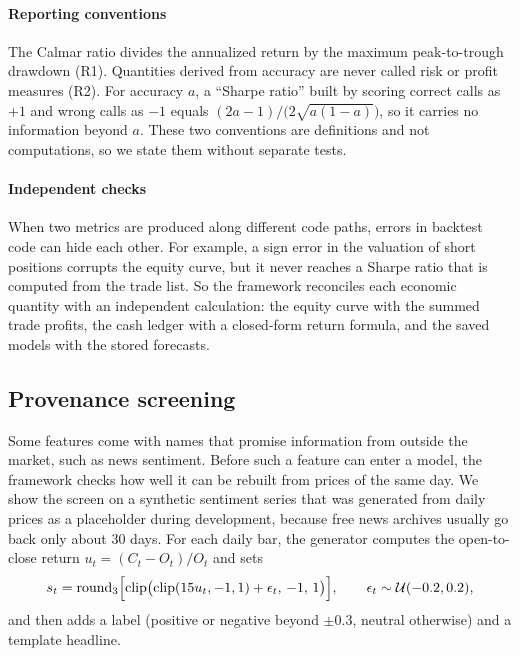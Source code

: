 \documentclass[preprint,12pt,authoryear,a4paper]{elsarticle}
\begin{document}
\paragraph{Reporting conventions} The Calmar ratio divides the annualized return by
the maximum peak-to-trough drawdown (R1). Quantities derived from accuracy are never
called risk or profit measures (R2). For accuracy $a$, a ``Sharpe ratio'' built by
scoring correct calls as $+1$ and wrong calls as $-1$ equals
$(2a-1)/\bigl(2\sqrt{a(1-a)}\bigr)$, so it carries no information beyond $a$. These
two conventions are definitions and not computations, so we state them without
separate tests.

\paragraph{Independent checks} When two metrics are produced along different code
paths, errors in backtest code can hide each other. For example, a sign error in the
valuation of short positions corrupts the equity curve, but it never reaches a
Sharpe ratio that is computed from the trade list. So the framework reconciles each
economic quantity with an independent calculation: the equity curve with the summed
trade profits, the cash ledger with a closed-form return formula, and the saved
models with the stored forecasts.

\subsection{Provenance screening}\label{ssec:provenance}

Some features come with names that promise information from outside the market,
such as news sentiment. Before such a feature can enter a model, the framework
checks how well it can be rebuilt from prices of the same day. We show the screen on
a synthetic sentiment series that was generated from daily prices as a placeholder
during development, because free news archives usually go back only about 30 days.
For each daily bar, the generator computes the open-to-close return
$u_t=(C_t-O_t)/O_t$ and sets
\begin{equation}
s_t=\operatorname{round}_3\Bigl[\operatorname{clip}\bigl(\operatorname{clip}(15u_t,-1,1)+\epsilon_t,\,-1,\,1\bigr)\Bigr],
\qquad \epsilon_t\sim\mathcal{U}(-0.2,0.2),
\label{eq:sentgen}
\end{equation}
and then adds a label (positive or negative beyond $\pm0.3$, neutral otherwise) and
a template headline.
\end{document}
